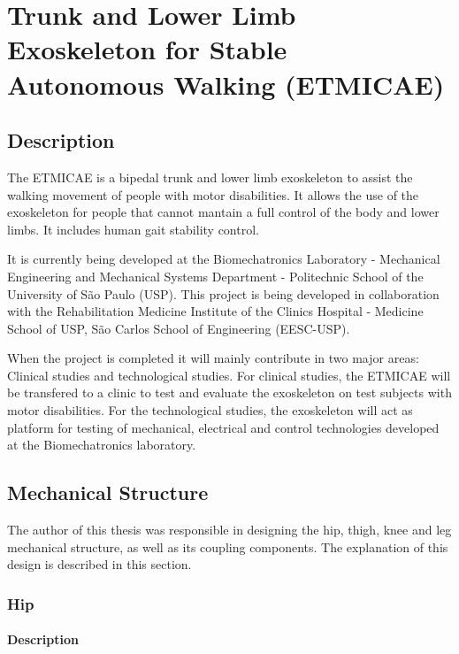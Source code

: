 \chapter{Trunk and Lower Limb Exoskeleton for Stable Autonomous Walking (ETMICAE)}

\section{Description}

The ETMICAE is a bipedal trunk and lower limb exoskeleton to assist the walking movement of people with motor disabilities. It allows the use of the exoskeleton for people that cannot mantain a full control of the body and lower limbs. It includes human gait stability control.

It is currently being developed at the Biomechatronics Laboratory - Mechanical Engineering and Mechanical Systems Department - Politechnic School of the University of São Paulo (USP). This project is being developed in collaboration with the Rehabilitation Medicine Institute of the Clinics Hospital - Medicine School of USP, São Carlos School of Engineering (EESC-USP).

When the project is completed it will mainly contribute in two major areas: Clinical studies and technological studies. For clinical studies, the ETMICAE will be transfered to a clinic to test and evaluate the exoskeleton on test subjects with motor disabilities. For the technological studies, the exoskeleton will act as platform for testing of mechanical, electrical and control technologies developed at the Biomechatronics laboratory. 

\section{Mechanical Structure}

The author of this thesis was responsible in designing the hip, thigh, knee and leg mechanical structure, as well as its coupling components. The explanation of this design is described in this section.

\subsection{Hip}

\subsubsection{Description}

